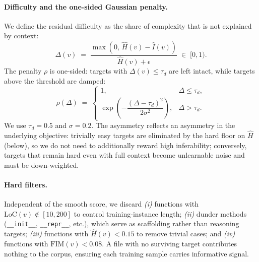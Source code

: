 \paragraph{Difficulty and the one-sided Gaussian penalty.}
We define the residual difficulty as the share of complexity that is not
explained by context:
\begin{equation}
  \Delta(v) \;=\; \frac{\max\!\left(0,\,\hat{H}(v) - \hat{I}(v)\right)}{\hat{H}(v) + \epsilon}
  \;\in\; [0, 1).
\end{equation}
The penalty $\rho$ is one-sided: targets with $\Delta(v) \le \tau_d$ are
left intact, while targets above the threshold are damped:
%
\begin{equation}
  \rho(\Delta) \;=\;
  \begin{cases}
    1, & \Delta \le \tau_d, \\[2pt]
    \exp\!\left(-\dfrac{(\Delta - \tau_d)^2}{2\sigma^2}\right), & \Delta > \tau_d.
  \end{cases}
\end{equation}
We use $\tau_d = 0.5$ and $\sigma = 0.2$. The asymmetry reflects an asymmetry
in the underlying objective: trivially easy targets are eliminated by the
hard floor on $\hat{H}$ (below), so we do not need to additionally reward
high inferability; conversely, targets that remain hard even with full
context become unlearnable noise and must be down-weighted.

\paragraph{Hard filters.}
Independent of the smooth score, we discard
\textit{(i)} functions with $\mathrm{LoC}(v) \notin [10, 200]$ to control
training-instance length;
\textit{(ii)} dunder methods (\texttt{\_\_init\_\_}, \texttt{\_\_repr\_\_},
etc.), which serve as scaffolding rather than reasoning targets;
\textit{(iii)} functions with $\hat{H}(v) < 0.15$ to remove trivial cases;
and \textit{(iv)} functions with $\mathrm{FIM}(v) < 0.08$.
A file with no surviving target contributes nothing to the corpus, ensuring
each training sample carries informative signal.

